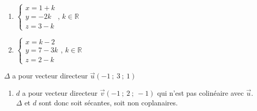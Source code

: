 \documentclass{cornouaille}
\begin{document}
\begin{colonne*exercice}
\begin{exercice*}
\begin{enumerate}
  \item \begin{center}
      $\begin{cases}x=1+k \\y=-2k \\z=3-k \end{cases}$,
      $k\in\mathbb{R}$\\[3mm]
    \end{center}

  \item \begin{center}
      $\begin{cases}x=k-2 \\y=7-3k \\z=2-k \end{cases}$,
      $k\in\mathbb{R}$
    \end{center}
  \end{enumerate}
\end{exercice*}
\begin{corrige}
  $\Delta$ a pour vecteur directeur $\overrightarrow{u}(-1\ ;\ 3\ ;\ 1)$

\begin{enumerate}
\item  $d$ a pour vecteur directeur $\overrightarrow{v}(-1\ ;\ 2\ ;\
  -1)$ qui n'est pas colinéaire avec $\overrightarrow{u}$. $\Delta$ et
  $d$ sont donc soit sécantes, soit non coplanaires.


\end{enumerate}
\end{corrige}
\end{colonne*exercice}
\end{document}
